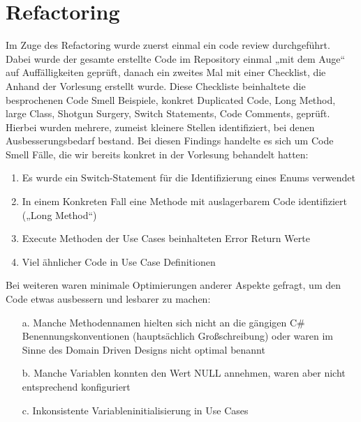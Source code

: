 \chapter{Refactoring}

Im Zuge des Refactoring wurde zuerst einmal ein code review durchgeführt. Dabei wurde der gesamte erstellte Code im Repository einmal „mit dem Auge“ auf Auffälligkeiten geprüft, danach ein zweites Mal mit einer Checklist, die Anhand der Vorlesung erstellt wurde. Diese Checkliste beinhaltete die besprochenen Code Smell Beispiele, konkret Duplicated Code, Long Method, large Class, Shotgun Surgery, Switch Statements, Code Comments, geprüft.
Hierbei wurden mehrere, zumeist kleinere Stellen identifiziert, bei denen Ausbesserungsbedarf bestand. Bei diesen Findings handelte es sich um Code Smell Fälle, die wir bereits konkret in der Vorlesung behandelt hatten:

\begin{enumerate}
\item Es wurde ein Switch-Statement für die Identifizierung eines Enums verwendet
\item In einem Konkreten Fall eine Methode mit auslagerbarem Code identifiziert („Long Method“)
\item Execute Methoden der Use Cases beinhalteten Error Return Werte
\item Viel ähnlicher Code in Use Case Definitionen
\end{enumerate}

Bei weiteren waren minimale Optimierungen anderer Aspekte gefragt, um den Code etwas ausbessern und lesbarer zu machen:

\begin{enumerate}
\item[a.] Manche Methodennamen hielten sich nicht an die gängigen C\# Benennungskonventionen (hauptsächlich Großschreibung) oder waren im Sinne des Domain Driven Designs nicht optimal benannt
\item[b.] Manche Variablen konnten den Wert NULL annehmen, waren aber nicht entsprechend konfiguriert
\item[c.] Inkonsistente Variableninitialisierung in Use Cases
\end{enumerate}

